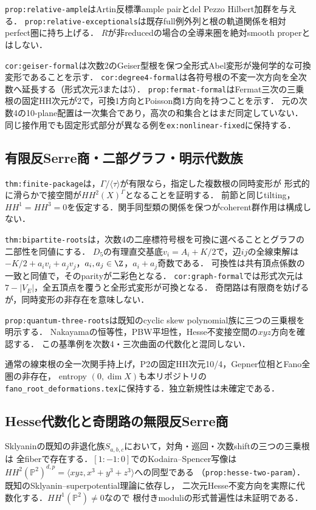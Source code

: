 \documentclass[11pt,a4paper]{ltjsarticle}
\begin{document}
\texttt{prop:relative-ample}はArtin反標準ample pairとdel Pezzo Hilbert加群を与える．
\texttt{prop:relative-exceptionals}は既存full例外列と根の軌道関係を相対perfect圏に持ち上げる．
$R$が非reducedの場合の全導来圏を絶対smooth properとはしない．

\texttt{cor:geiser-formal}は次数2のGeiser型根を保つ全形式Abel変形が幾何学的な可換変形であることを示す．
\texttt{cor:degree4-formal}は各符号根の不変一次方向を全次数へ延長する（形式次元3または5）．
\texttt{prop:fermat-formal}はFermat三次の三乗根の固定HH次元が2で，可換1方向とPoisson商1方向を持つことを示す．
元の次数4の10-plane配置は一次集合であり，高次の和集合とはまだ同定していない．
同じ接作用でも固定形式部分が異なる例を\texttt{ex:nonlinear-fixed}に保持する．

\subsection{有限反Serre商・二部グラフ・明示代数族}
\texttt{thm:finite-package}は，$\Gamma/\langle\tau\rangle$が有限なら，指定した複数根の同時変形が
形式的に滑らかで接空間が$HH^2(X)^\Gamma$となることを証明する．
前節と同じtilting，$HH^1=HH^3=0$を仮定する．関手同型類の関係を保つがcoherent群作用は構成しない．

\texttt{thm:bipartite-roots}は，次数4の二座標符号根を可換に選べることとグラフの二部性を同値にする．
$D_5$の有理直交基底$v_i=A_i+K/2$で，辺$ij$の全線束解は
$-K/2+a_iv_i+a_jv_j$，$a_i,a_j\in\Z$，$a_i+a_j$奇数である．
可換性は共有頂点係数の一致と同値で，そのparityが二彩色となる．
\texttt{cor:graph-formal}では形式次元は$7-|V_E|$，全五頂点を覆うと全形式変形が可換となる．
奇閉路は有限商を妨げるが，同時変形の非存在を意味しない．

\texttt{prop:quantum-three-roots}は既知のcyclic skew polynomial族に三つの三乗根を明示する．
Nakayamaの恒等性，PBW平坦性，Hesse不変接空間の$xyz$方向を確認する．
この基準例を次数4・三次曲面の代数化と混同しない．

通常の線束根の全一次関手持上げ，P2の固定HH次元10/4，Gepner位相とFano全圏の非存在，
entropy $(0,\dim X)$も本リポジトリの\texttt{fano\_root\_deformations.tex}に保持する．独立新規性は未確定である．

\subsection{Hesse代数化と奇閉路の無限反Serre商}
Sklyaninの既知の非退化族$S_{a,b,c}$において，対角・巡回・次数shiftの三つの三乗根は
全fiberで存在する．$[1:-1:0]$でのKodaira--Spencer写像は
$HH^2(\mathbb P^2)^{d,p}=\langle xyz,x^3+y^3+z^3\rangle$への同型である
（\texttt{prop:hesse-two-param}）．既知のSklyanin--superpotential理論に依存し，
二次元Hesse不変方向を実際に代数化する．$HH^1(\mathbb P^2)\ne0$なので
根付きmoduliの形式普遍性は未証明である．
\end{document}
